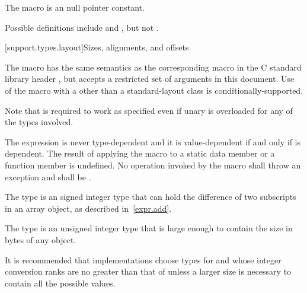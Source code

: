 \pnum
The macro
%
is an  null pointer constant.
\begin{footnote}
Possible definitions include
and
,
but not
.
\end{footnote}


[support.types.layout]{Sizes, alignments, and offsets}

\pnum
The macro
%
has the same semantics as the corresponding macro in
the C standard library header , but
accepts a restricted set of 
arguments in this document.
Use of the  macro with a 
other than a standard-layout class
is conditionally-supported.
\begin{footnote}
Note that 
is required to work as specified even if unary
is overloaded for any of the types involved.
\end{footnote}\space
The expression 
is never type-dependent and it is
value-dependent if and only if  is
dependent. The result of applying the  macro to
a static data member or a function member is undefined.
No operation invoked by the  macro shall throw an exception and
 shall be .

\pnum
The type  is an
signed integer type that can
hold the difference of two subscripts in an array object, as described in~\ref{expr.add}.

\pnum
The type  is an
unsigned integer type that is large enough
to contain the size in bytes of any object.

\pnum
\begin{note}
It is recommended that implementations choose types for  and 
whose integer conversion ranks are no greater than that of
 unless a larger size is necessary to contain all the possible values.
\end{note}

